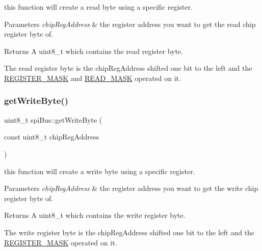 this function will create a read byte using a specific register. 


\begin{DoxyParams}{Parameters}
{\em chip\+Reg\+Address} & the register address you want to get the read chip register byte of. \\
\hline
\end{DoxyParams}
\begin{DoxyReturn}{Returns}
A uint8\+\_\+t which contains the read register byte.
\end{DoxyReturn}
The read register byte is the chip\+Reg\+Address shifted one bit to the left and the \mbox{\hyperlink{classspi_bus_acd898d08216428963563e20f033423b3}{R\+E\+G\+I\+S\+T\+E\+R\+\_\+\+M\+A\+SK}} and \mbox{\hyperlink{classspi_bus_a0dda31f7fa031ef8913e029d2eb4acf9}{R\+E\+A\+D\+\_\+\+M\+A\+SK}} operated on it. \mbox{\label{classspi_bus_af09ae8625cbb1c5353e3777af6bf5ae3}} 
\subsubsection{\texorpdfstring{get\+Write\+Byte()}{getWriteByte()}}
{\footnotesize\ttfamily uint8\+\_\+t spi\+Bus\+::get\+Write\+Byte (\begin{DoxyParamCaption}\item[{const uint8\+\_\+t}]{chip\+Reg\+Address }\end{DoxyParamCaption})\hspace{0.3cm}{\ttfamily [private]}}



this function will create a write byte using a specific register. 


\begin{DoxyParams}{Parameters}
{\em chip\+Reg\+Address} & the register address you want to get the write chip register byte of. \\
\hline
\end{DoxyParams}
\begin{DoxyReturn}{Returns}
A uint8\+\_\+t which contains the write register byte.
\end{DoxyReturn}
The write register byte is the chip\+Reg\+Address shifted one bit to the left and the \mbox{\hyperlink{classspi_bus_acd898d08216428963563e20f033423b3}{R\+E\+G\+I\+S\+T\+E\+R\+\_\+\+M\+A\+SK}} operated on it. \mbox{\label{classspi_bus_a3322a039f33a7180a9a57da662607b7d}} 
